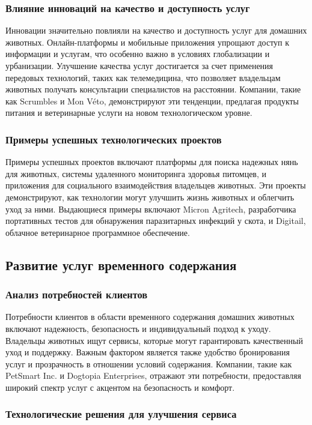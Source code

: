 \subsubsection{Влияние инноваций на качество и доступность услуг}

Инновации значительно повлияли на качество и доступность услуг для домашних животных. Онлайн-платформы и мобильные приложения упрощают доступ к информации и услугам, что особенно важно в условиях глобализации и урбанизации. Улучшение качества услуг достигается за счет применения передовых технологий, таких как телемедицина, что позволяет владельцам животных получать консультации специалистов на расстоянии. Компании, такие как Scrumbles и Mon Véto, демонстрируют эти тенденции, предлагая продукты питания и ветеринарные услуги на новом технологическом уровне.
\subsubsection{Примеры успешных технологических проектов}

Примеры успешных проектов включают платформы для поиска надежных нянь для животных, системы удаленного мониторинга здоровья питомцев, и приложения для социального взаимодействия владельцев животных. Эти проекты демонстрируют, как технологии могут улучшить жизнь животных и облегчить уход за ними. Выдающиеся примеры включают Micron Agritech, разработчика портативных тестов для обнаружения паразитарных инфекций у скота, и Digitail, облачное ветеринарное программное обеспечение.
\subsection{Развитие услуг временного содержания}
\subsubsection{Анализ потребностей клиентов}

Потребности клиентов в области временного содержания домашних животных включают надежность, безопасность и индивидуальный подход к уходу. Владельцы животных ищут сервисы, которые могут гарантировать качественный уход и поддержку. Важным фактором является также удобство бронирования услуг и прозрачность в отношении условий содержания. Компании, такие как PetSmart Inc. и Dogtopia Enterprises, отражают эти потребности, предоставляя широкий спектр услуг с акцентом на безопасность и комфорт.
\subsubsection{Технологические решения для улучшения сервиса}

